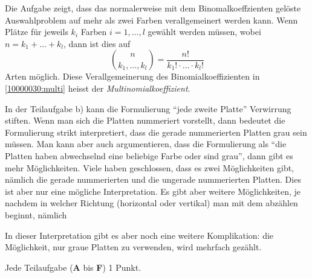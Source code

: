 \begin{diskussion}
Die Aufgabe zeigt, dass das normalerweise mit dem Binomalkoeffzienten
gelöste Auswahlproblem auf mehr als zwei Farben verallgemeinert werden
kann.
Wenn Plätze für jeweils $k_i$ Farben $i=1,\dots,l$ gewählt werden
müssen, wobei $n=k_1+\dots+k_l$, dann ist dies auf
\begin{equation}
\binom{n}{k_1,\dots,k_l}
=
\frac{n!}{k_1!\cdot\ldots\cdot k_l!}
\label{10000030:multi}
\end{equation}
Arten möglich.
Diese Verallgemeinerung des Binomialkoeffizienten in
\eqref{10000030:multi} heisst der {\em Multinomialkoeffizient}.

In der Teilaufgabe b) kann die Formulierung ``jede zweite Platte''
Verwirrung stiften.
Wenn man sich die Platten nummeriert vorstellt, dann bedeutet die
Formulierung strikt interpretiert, dass die gerade nummerierten Platten
grau sein müssen.
Man kann aber auch argumentieren, dass die Formulierung als ``die
Platten haben abwechselnd eine beliebige Farbe oder sind grau'',
dann gibt es mehr Möglichkeiten.
Viele haben geschlossen, dass es zwei Möglichkeiten gibt, nämlich die
gerade nummerierten und die ungerade nummerierten Platten.
Dies ist aber nur eine mögliche Interpretation.
Es gibt aber weitere Möglichkeiten, je nachdem in welcher Richtung
(horizontal oder vertikal) man mit dem abzählen beginnt, nämlich
\begin{center}
\def\feld#1#2{
	\fill[color=gray] ({(#1)*0.5},{(#2)*0.5}) rectangle ++ (0.5,0.5);
}
\def\rechteck{
	\foreach \x in {0,...,4}{
		\draw ({0.5*\x},0) -- ++(0,{3*0.5});
	}
	\foreach \y in {0,...,3}{
		\draw (0,{0.5*\y}) -- ++({4*0.5},0);
	}
}
\end{center}
In dieser Interpretation gibt es aber noch eine weitere Komplikation:
die Möglichkeit, nur graue Platten zu verwenden, wird mehrfach 
gezählt.
\end{diskussion}


\begin{bewertung}
Jede Teilaufgabe ({\bf A} bis {\bf F}) 1 Punkt.
\end{bewertung}
